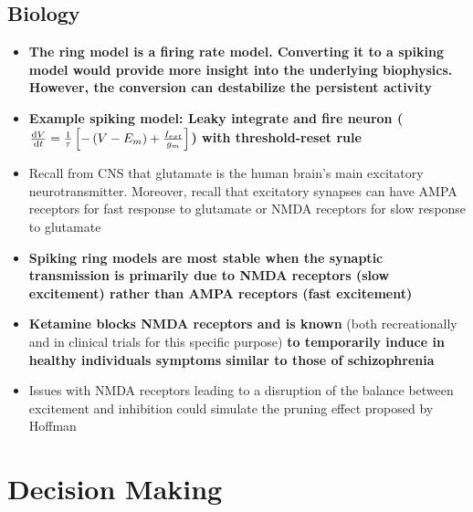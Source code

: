 \documentclass[20pt,a4paper,landscape]{extarticle}
\begin{document}
\begin{flushleft}
\subsection{Biology}
\begin{itemize}
\item \textbf{The ring model is a firing rate model. Converting it to a spiking model would provide more insight into the underlying biophysics. However, the conversion can destabilize the persistent activity}
\item \textbf{Example spiking model: Leaky integrate and fire neuron (\boldmath$\odv{V}{t} = \frac{1}{\tau}\left[-\left(V - E_m\right) + \frac{I_{ext}}{g_m}\right]$) with threshold-reset rule}
\item Recall from CNS that glutamate is the human brain's main excitatory neurotransmitter. Moreover, recall that excitatory synapses can have AMPA receptors for fast response to glutamate or NMDA receptors for slow response to glutamate
\item \textbf{Spiking ring models are most stable when the synaptic transmission is primarily due to NMDA receptors (slow excitement) rather than AMPA receptors (fast excitement)}
\item \textbf{Ketamine blocks NMDA receptors and is known} (both recreationally and in clinical trials for this specific purpose) \textbf{to temporarily induce in healthy individuals symptoms similar to those of schizophrenia}
\item Issues with NMDA receptors leading to a disruption of the balance between excitement and inhibition could simulate the pruning effect proposed by Hoffman
\end{itemize}
\clearpage
\section{Decision Making}

\end{flushleft}
\end{document}
